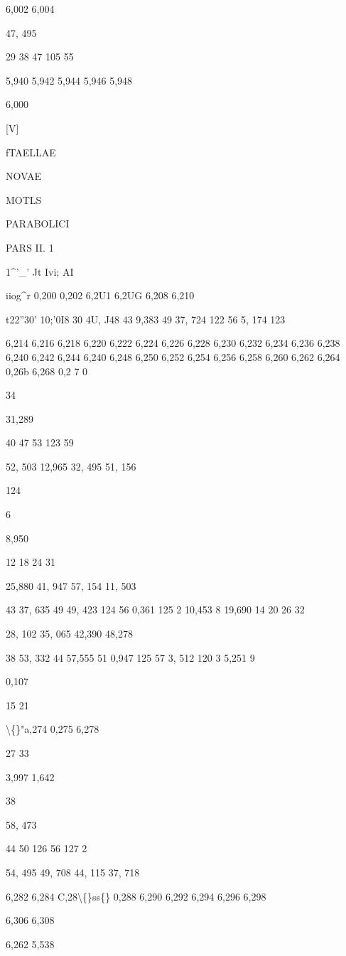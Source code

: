 \documentclass[10pt,a4paper]{article}
\begin{document}
6,002
6,004

47, 495

29
38
47
105 55

5,940
5,942
5,944
5,946
5,948

6,000

[V]

\newpage

fTAELLAE

NOVAE

MOTLS

PARABOLICI

PARS II. 1

1\textasciicircum{}'\_' Jt
Ivi; AI

iiog\textasciicircum{}r
0,200
0,202
6,2U1
6,2UG
6,208
6,210

t22''30' 10;'0I8
30 4U, J48
43
9,383
49 37, 724
122 56
5, 174
123

6,214
6,216
6,218
6,220
6,222
6,224
6,226
6,228
6,230
6,232
6,234
6,236
6,238
6,240
6,242
6,244
6,240
6,248
6,250
6,252
6,254
6,256
6,258
6,260
6,262
6,264
0,26b
6,268
0,2 7 0

34

31,289

40
47
53
123 59

52, 503
12,965
32, 495
51, 156

124

6

8,950

12
18
24
31

25,880
41, 947
57, 154
11, 503

43 37, 635
49 49, 423
124 56
0,361
125 2 10,453
8 19,690
14
20
26
32

28, 102
35, 065
42,390
48,278

38 53, 332
44 57,555
51
0,947
125 57
3, 512
120
3
5,251
9

0,107

15
21

\textbackslash\{\}"a,274
0,275
6,278

27
33

3,997
1,642

38

58, 473

44
50
126 56
127 2

54, 495
49, 708
44, 115
37, 718

6,282
6,284
C,28\textbackslash\{\}ss\{\}
0,288
6,290
6,292
6,294
6,296
6,298

6,306
6,308

6,262
5,538
\end{document}
